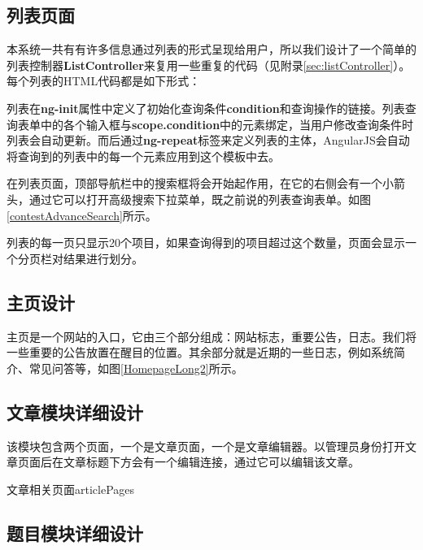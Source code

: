 \subsection{列表页面}
本系统一共有有许多信息通过列表的形式呈现给用户，所以我们设计了一个简单的列表控制器\textbf{ListController}来复用一些重复的代码（见附录\ref{sec:listController}）。每个列表的HTML代码都是如下形式：



列表在\textbf{ng-init}属性中定义了初始化查询条件\textbf{condition}和查询操作的链接。列表查询表单中的各个输入框与\textbf{scope.condition}中的元素绑定，当用户修改查询条件时列表会自动更新。而后通过\textbf{ng-repeat}标签来定义列表的主体，AngularJS会自动将查询到的列表中的每一个元素应用到这个模板中去。

在列表页面，顶部导航栏中的搜索框将会开始起作用，在它的右侧会有一个小箭头，通过它可以打开高级搜索下拉菜单，既之前说的列表查询表单。如图\ref{contestAdvanceSearch}所示。


列表的每一页只显示20个项目，如果查询得到的项目超过这个数量，页面会显示一个分页栏对结果进行划分。


\subsection{主页设计}
主页是一个网站的入口，它由三个部分组成：网站标志，重要公告，日志。我们将一些重要的公告放置在醒目的位置。其余部分就是近期的一些日志，例如系统简介、常见问答等，如图\ref{HomepageLong2}所示。

\subsection{文章模块详细设计}
该模块包含两个页面，一个是文章页面，一个是文章编辑器。以管理员身份打开文章页面后在文章标题下方会有一个编辑连接，通过它可以编辑该文章。

\begin{pics}[htbp]{文章相关页面}{articlePages}
\end{pics}

\subsection{题目模块详细设计}
